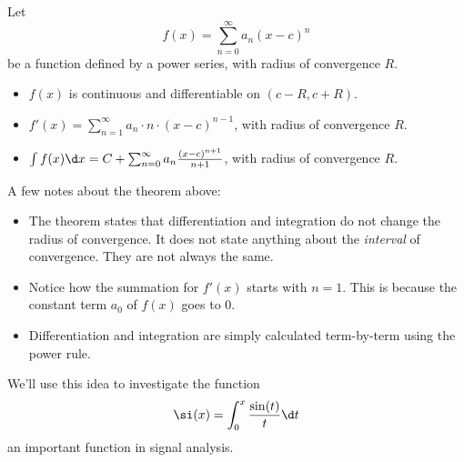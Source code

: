 \documentclass{ximera}
\begin{document}
\begin{theorem}
  Let
  \[
  f(x) = \sum_{n=0}^\infty a_n(x-c)^n
  \]
  be a function defined by a power series, with radius of convergence $R$.
  \begin{itemize}
  \item $f(x)$ is continuous and differentiable on $(c-R,c+R)$.
  \item	$f'(x) = \sum_{n=1}^\infty a_n\cdot n\cdot (x-c)^{n-1}$, with radius of convergence $R$.
  \item	$\int f(x) \d x = C+\sum_{n=0}^\infty a_n\frac{(x-c)^{n+1}}{n+1}$, with radius of convergence $R$.
  \end{itemize}
\end{theorem}
A few notes about the theorem above:
\begin{itemize}
\item The theorem states that differentiation and integration do not
  change the radius of convergence. It does not state anything about
  the \textit{interval} of convergence. They are not always the same.
\item Notice how the summation for $f'(x)$ starts with $n=1$. This is
  because the constant term $a_0$ of $f(x)$ goes to $0$.
\item Differentiation and integration are simply calculated
  term-by-term using the power rule.
\end{itemize}

We'll use this idea to investigate the function 
\[
\si(x) = \int_0^x \frac{\sin(t)}{t} \d t
\]
an important function in signal analysis.
\end{document}
